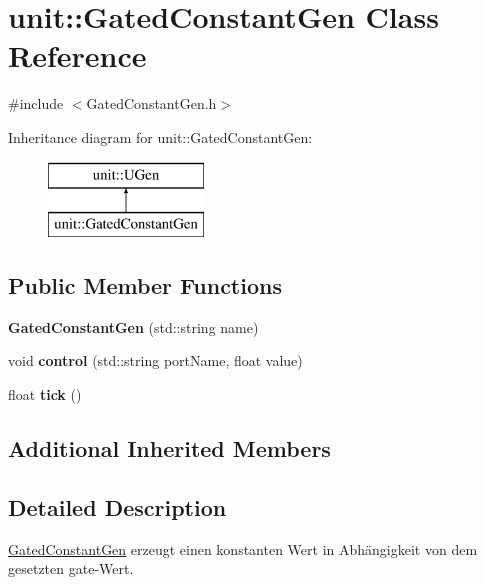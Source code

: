 \hypertarget{classunit_1_1GatedConstantGen}{}\section{unit\+:\+:Gated\+Constant\+Gen Class Reference}
\label{classunit_1_1GatedConstantGen}


{\ttfamily \#include $<$Gated\+Constant\+Gen.\+h$>$}

Inheritance diagram for unit\+:\+:Gated\+Constant\+Gen\+:\begin{figure}[H]
\begin{center}
\leavevmode
\includegraphics[height=2.000000cm]{classunit_1_1GatedConstantGen}
\end{center}
\end{figure}
\subsection*{Public Member Functions}
\begin{DoxyCompactItemize}
\item 
{\bfseries Gated\+Constant\+Gen} (std\+::string name)\hypertarget{classunit_1_1GatedConstantGen_ad30ad26411f421228c8f7075b4d27f9a}{}\label{classunit_1_1GatedConstantGen_ad30ad26411f421228c8f7075b4d27f9a}

\item 
void {\bfseries control} (std\+::string port\+Name, float value)\hypertarget{classunit_1_1GatedConstantGen_a8365ddc2a6ddebc86e196fa381a5648d}{}\label{classunit_1_1GatedConstantGen_a8365ddc2a6ddebc86e196fa381a5648d}

\item 
float {\bfseries tick} ()\hypertarget{classunit_1_1GatedConstantGen_aafff659359fed9f28c703acd0076c081}{}\label{classunit_1_1GatedConstantGen_aafff659359fed9f28c703acd0076c081}

\end{DoxyCompactItemize}
\subsection*{Additional Inherited Members}


\subsection{Detailed Description}
\hyperlink{classunit_1_1GatedConstantGen}{Gated\+Constant\+Gen} erzeugt einen konstanten Wert in Abhängigkeit von dem gesetzten gate-\/\+Wert.


